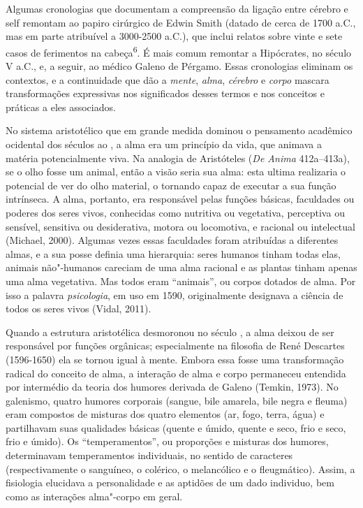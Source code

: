 Algumas cronologias que documentam a compreensão da ligação entre
cérebro e self remontam ao papiro cirúrgico de Edwin Smith (datado de
cerca de 1700 a.C., mas em parte atribuível a 3000-2500 a.C.), que
inclui relatos sobre vinte e sete casos de ferimentos na
cabeça\textsuperscript{6}. É mais comum remontar a Hipócrates, no século
V a.C., e, a seguir, ao médico Galeno de Pérgamo. Essas cronologias
eliminam os contextos, e a continuidade que dão a \emph{mente},
\emph{alma}, \emph{cérebro} e \emph{corpo} mascara transformações
expressivas nos significados desses termos e nos conceitos e práticas a
eles associados.

No sistema aristotélico que em grande medida dominou o pensamento
acadêmico ocidental dos séculos  ao , a alma era um princípio da
vida, que animava a matéria potencialmente viva. Na analogia de
Aristóteles (\emph{De Anima} 412a--413a), se o olho fosse um animal,
então a visão seria sua alma: esta ultima realizaria o potencial de ver
do olho material, o tornando capaz de executar a sua função intrínseca.
A alma, portanto, era responsável pelas funções básicas, faculdades ou
poderes dos seres vivos, conhecidas como nutritiva ou vegetativa,
perceptiva ou sensível, sensitiva ou desiderativa, motora ou locomotiva,
e racional ou intelectual (Michael, 2000). Algumas vezes essas
faculdades foram atribuídas a diferentes almas, e a sua posse definia
uma hierarquia: seres humanos tinham todas elas, animais não"-humanos
careciam de uma alma racional e as plantas tinham apenas uma alma
vegetativa. Mas todos eram ``animais'', ou corpos dotados de alma. Por
isso a palavra \emph{psicologia}, em uso em 1590, originalmente
designava a ciência de todos os seres vivos (Vidal, 2011).

Quando a estrutura aristotélica desmoronou no século , a alma deixou
de ser responsável por funções orgânicas; especialmente na filosofia de
René Descartes (1596-1650) ela se tornou igual à mente. Embora essa
fosse uma transformação radical do conceito de alma, a interação de alma
e corpo permaneceu entendida por intermédio da teoria dos humores
derivada de Galeno (Temkin, 1973). No galenismo, quatro humores
corporais (sangue, bile amarela, bile negra e fleuma) eram compostos de
misturas dos quatro elementos (ar, fogo, terra, água) e partilhavam suas
qualidades básicas (quente e úmido, quente e seco, frio e seco, frio e
úmido). Os ``temperamentos'', ou proporções e misturas dos humores,
determinavam temperamentos individuais, no sentido de caracteres
(respectivamente o sanguíneo, o colérico, o melancólico e o
fleugmático). Assim, a fisiologia elucidava a personalidade e as
aptidões de um dado individuo, bem como as interações alma"-corpo em
geral.

